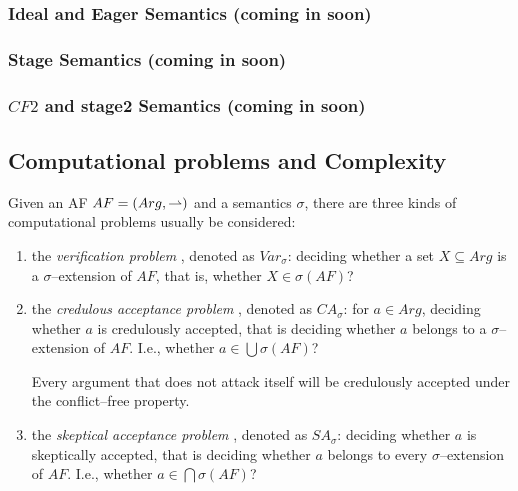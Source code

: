

\subsubsection{Ideal and Eager Semantics (coming in soon)}

\subsubsection{Stage Semantics (coming in soon)}

\subsubsection{$CF2$ and stage2 Semantics (coming in soon)}




\subsection{Computational problems and Complexity}



Given an AF $AF=(Arg,\rightharpoonup)$ and a semantics $\sigma$, 
there are three kinds of computational problems usually be considered:
\begin{enumerate}[itemsep=5pt,parsep=5pt,leftmargin=3em,topsep=5pt,label=(\arabic*)] %
    \item 
    the \textit{verification problem}  , 
    denoted as {\color{purple} $Var_\sigma$}: 
    deciding whether a set $X \subseteq Arg$ is a $\sigma$--extension of $AF$, 
    that is, whether $X \in \sigma(AF)$?

    \item 
    the \textit{credulous acceptance problem} , 
    denoted as {\color{purple} $CA_\sigma$}: 
    for $a \in Arg$, 
    deciding whether $a$ is credulously accepted, 
    that is deciding whether $a$ belongs to a $\sigma$--extension of $AF$. 
    I.e., whether $a \in \bigcup \sigma(AF)$?

    Every argument that does not attack itself will be credulously accepted under the conflict--free property.

    \item 
    the \textit{skeptical acceptance problem} , 
    denoted as {\color{purple} $SA_\sigma$}: 
    deciding whether $a$ is skeptically  accepted, 
    that is deciding whether $a$ belongs to every $\sigma$--extension of $AF$.
    I.e.,  whether $a \in \bigcap \sigma(AF)$?
\end{enumerate}


